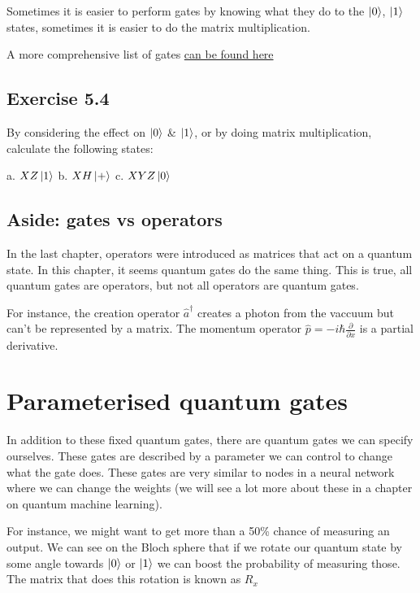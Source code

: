 \documentclass{book}
\begin{document}
Sometimes it is easier to perform gates by knowing what they do to the $\ket{0}$, $\ket{1}$ states, sometimes it is easier to do the matrix multiplication. 

A more comprehensive list of gates \href{https://raw.githubusercontent.com/qiskit-community/qiskit-textbook/main/content/ch-states/supplements/single-gates-cheatsheet.pdf}{can be found here}


\hline
\subsection{Exercise 5.4}

By considering the effect on $\ket{0}$ \& $ \ket{1}$, or by doing matrix multiplication, calculate the following states:

a. $ XZ\ket{1}$  
b. $ XH\ket{+} $  
c. $ XYZ\ket{0} $
\hline

\subsection{Aside: gates vs operators}

In the last chapter, operators were introduced as matrices that act on a quantum state. In this chapter, it seems quantum gates do the same thing. This is true, all quantum gates are operators, but not all operators are quantum gates. 

For instance, the creation operator $\hat{a}^\dagger$ creates a photon from the vaccuum but can't be represented by a matrix. The momentum operator $\hat{p} = -i\hbar\frac{\partial}{\partial x}$ is a partial derivative. 


\section{Parameterised quantum gates }

In addition to these fixed quantum gates, there are quantum gates we can specify ourselves. These gates are described by a parameter we can control to change what the gate does. These gates are very similar to nodes in a neural network where we can change the weights (we will see a lot more about these in a chapter on quantum machine learning).

For instance, we might want to get more than a 50\% chance of measuring an output. We can see on the Bloch sphere that if we rotate our quantum state by some angle towards $\ket{0}$ or $\ket{1}$ we can boost the probability of measuring those. The matrix that does this rotation is known as $R_x$
\end{document}
